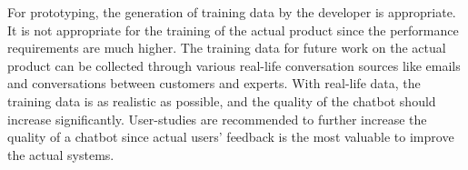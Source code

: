 For prototyping, the generation of training data by the developer is appropriate.
It is not appropriate for the training of the actual product since the performance requirements are much higher.
The training data for future work on the actual product can be collected through various real-life conversation sources like emails and conversations between customers and experts.
With real-life data, the training data is as realistic as possible, and the quality of the chatbot should increase significantly.
User-studies are recommended to further increase the quality of a chatbot since actual users' feedback is the most valuable to improve the actual systems.